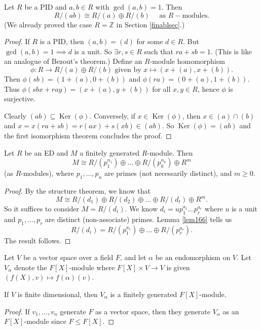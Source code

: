 \documentclass[egregdoesnotlikesansseriftitles,a4paper]{scrartcl}
\begin{document}
\begin{lemma}\label{lem166}
        Let $R$ be a PID and $a,b \in R$ with $\operatorname{gcd}(a,b)=1$. Then \[
        R/ (ab ) \cong R/(a) \oplus R/(b) \quad \text{ as } R- \text{modules} 
        .\] (We already proved the case $R=\mathbb{Z}$ in Section \ref{finablsec}.)
        \begin{proof}
                If $R$ is a PID, then $(a,b)=(d)$ for some $d \in R$. But $\operatorname{gcd}(a,b)=1 \implies d$ is a unit. So $\exists r ,s \in R$ such that $ra+sb=1$. (This is like an analogue of Bezout's theorem.) Define an $R$-module homomorphism \[
                \phi: R \rightarrow R/(a) \oplus R/(b) \text{ given by } x \mapsto (x+ (a), x +(b))
                .\] Then $\phi (sb)= (1+(a),0+ (b))$ and $\phi (ra)=(0+(a),1+ (b))$. Thus $\phi (sbx +ray)= (x + (a),y+(b))$ for all $x,y \in R$, hence $\phi$ is surjective. 

                Clearly $(ab) \subseteq \operatorname{Ker}(\phi)$. Conversely,  if $x \in \operatorname{Ker}(\phi)$, then $x \in (a) \cap (b)$ and $x = x (ra+sb)=r(ax)+s (xb)\in (ab) $. So $\operatorname{Ker}(\phi)=(ab )$ and the first isomorphism theorem concludes the proof.
        \end{proof}
\end{lemma}
\begin{theorem}
        Let $R$ be an ED and $M$ a finitely generated $R$-module. Then \[
        M \cong R/(p_1^{n_1 }) \oplus \ldots \oplus R/ (p_{k}^{n_k}) \oplus R^{m}
        \] (as $R$-modules), where $p_1, \ldots , p_n$ are primes (not necessarily distinct), and $m \geq 0$. 
        \begin{proof}
                By the structure theorem, we know that \[
                M \cong R/(d_1) \oplus R/(d_2) \oplus \ldots  \oplus R/(d_t) \oplus R^m
                .\] So it suffices to consider $M= R/ (d_{i})$. We know $d_i = u p_1 ^{a_1 }\ldots p_{r}^{a_{r}}$ where $u$ is a unit and $p_1 , \ldots, p_{r}$ are distinct (non-associate) primes. Lemma \ref{lem166} tells us \[
                R/(d_{i})= R/ (p_{1}^{a_1 })\oplus \ldots \oplus R/(p_{r}^{a_{r}})
                .\] The result follows.
        \end{proof}
\end{theorem}
Let $V$ be a vector space over a field $F$, and let $\alpha$ be an endomorphism on $V$. Let $V_{\alpha}$ denote the $F[X]$-module where $F[X] \times V \rightarrow V$ is given $(f (X),v) \mapsto f (\alpha)(v)$.
\begin{lemma}
        If $V$ is finite dimensional, then $V_{\alpha}$ is a finitely generated $F[X]$-module.
        \begin{proof}
                If $v_1 , \ldots, v_{n}$ generate $F$ as a vector space, then they generate $V_{\alpha}$ as an $F[X]$-module since $F \leq F[X]$.
        \end{proof}
\end{lemma}
\end{document}
